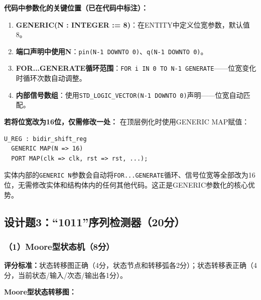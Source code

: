 \textbf{代码中参数化的关键位置（已在代码中标注）：}
\begin{enumerate}
\item \textbf{GENERIC(N : INTEGER := 8)}：在ENTITY中定义位宽参数，默认值8。
\item \textbf{端口声明中使用N}：\texttt{pin(N-1 DOWNTO 0)}、\texttt{q(N-1 DOWNTO 0)}。
\item \textbf{FOR...GENERATE循环范围}：\texttt{FOR i IN 0 TO N-1 GENERATE}——位宽变化时循环次数自动调整。
\item \textbf{内部信号数组}：使用\texttt{STD\_LOGIC\_VECTOR(N-1 DOWNTO 0)}声明——位宽自动匹配。
\end{enumerate}

\textbf{若将位宽改为16位，仅需修改一处：}
在顶层例化时使用GENERIC MAP赋值：
\begin{lstlisting}[language=VDL]
U_REG : bidir_shift_reg
  GENERIC MAP(N => 16)
  PORT MAP(clk => clk, rst => rst, ...);
\end{lstlisting}
实体内部的\texttt{GENERIC N}参数会自动将\texttt{FOR...GENERATE}循环、信号位宽等全部改为16位，无需修改实体和结构体内的任何其他代码。这正是GENERIC参数化的核心优势。

\subsection{设计题3：“1011”序列检测器（20分）}

\subsubsection{（1）Moore型状态机（8分）}

\begin{framed}
\textbf{评分标准：}状态转移图正确（4分，状态节点和转移弧各2分）；状态转移表正确（4分，当前状态/输入/次态/输出各1分）。
\end{framed}

\textbf{Moore型状态转移图：}

